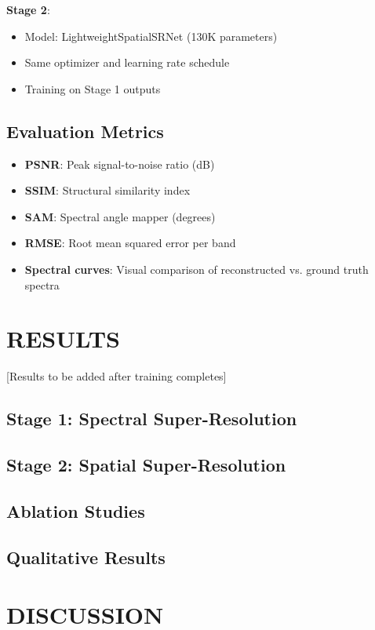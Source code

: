 \documentclass[]{spieman}
\begin{document}
\textbf{Stage 2}:
\begin{itemize}
\item Model: LightweightSpatialSRNet (130K parameters)
\item Same optimizer and learning rate schedule
\item Training on Stage 1 outputs
\end{itemize}

\subsection{Evaluation Metrics}

\begin{itemize}
\item \textbf{PSNR}: Peak signal-to-noise ratio (dB)
\item \textbf{SSIM}: Structural similarity index
\item \textbf{SAM}: Spectral angle mapper (degrees)
\item \textbf{RMSE}: Root mean squared error per band
\item \textbf{Spectral curves}: Visual comparison of reconstructed vs. ground truth spectra
\end{itemize}

\section{RESULTS}
\label{sec:results}

[Results to be added after training completes]

\subsection{Stage 1: Spectral Super-Resolution}

\subsection{Stage 2: Spatial Super-Resolution}

\subsection{Ablation Studies}

\subsection{Qualitative Results}

\section{DISCUSSION}
\label{sec:discussion}
\end{document}
